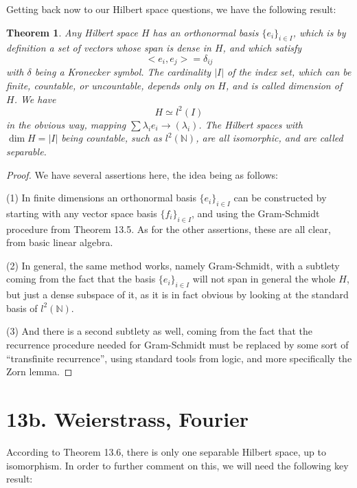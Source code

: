 \documentclass[12pt]{amsbook}
\newtheorem{theorem}{Theorem}[chapter]
\begin{document}
Getting back now to our Hilbert space questions, we have the following result:


\begin{theorem}
Any Hilbert space $H$ has an orthonormal basis $\{e_i\}_{i\in I}$, which is by definition a set of vectors whose span is dense in $H$, and which satisfy
$$<e_i,e_j>=\delta_{ij}$$
with $\delta$ being a Kronecker symbol. The cardinality $|I|$ of the index set, which can be finite, countable, or uncountable, depends only on $H$, and is called dimension of $H$. We have
$$H\simeq l^2(I)$$
in the obvious way, mapping $\sum\lambda_ie_i\to(\lambda_i)$. The Hilbert spaces with $\dim H=|I|$ being countable, such as $l^2(\mathbb N)$, are all isomorphic, and are called separable.
\end{theorem}

\begin{proof}
We have several assertions here, the idea being as follows:

\medskip

(1) In finite dimensions an orthonormal basis $\{e_i\}_{i\in I}$ can be constructed by starting with any vector space basis $\{f_i\}_{i\in I}$, and using the Gram-Schmidt procedure from Theorem 13.5. As for the other assertions, these are all clear, from basic linear algebra.

\medskip

(2) In general, the same method works, namely Gram-Schmidt, with a subtlety coming from the fact that the basis $\{e_i\}_{i\in I}$ will not span in general the whole $H$, but just a dense subspace of it, as it is in fact obvious by looking at the standard basis of $l^2(\mathbb N)$. 

\medskip

(3) And there is a second subtlety as well, coming from the fact that the recurrence procedure needed for Gram-Schmidt must be replaced by some sort of ``transfinite recurrence'', using standard tools from logic, and more specifically the Zorn lemma.
\end{proof}

\section*{13b. Weierstrass, Fourier}

According to Theorem 13.6, there is only one separable Hilbert space, up to isomorphism. In order to further comment on this, we will need the following key result:
\end{document}
